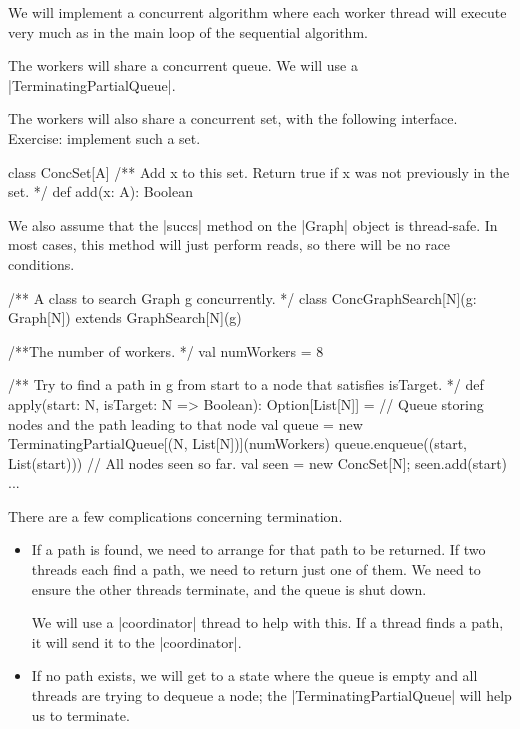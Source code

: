 
\begin{slide}

We will implement a concurrent algorithm where each worker thread will execute
very much as in the main loop of the sequential algorithm.

The workers will share a concurrent queue.  We will use a
|TerminatingPartialQueue|. 

The workers will also share a concurrent set, with the following interface.
Exercise: implement such a set.
%
\begin{scala}
class ConcSet[A]{
  /** Add x to this set.  Return true if x was not previously in the set. */
  def add(x: A): Boolean
}
\end{scala}

We also assume that the |succs| method on the |Graph| object is thread-safe.
In most cases, this method will just perform reads, so there will be no race
conditions. 
\end{slide}


\begin{slide}

\begin{scala}
/** A class to search Graph g concurrently. */
class ConcGraphSearch[N](g: Graph[N]) extends GraphSearch[N](g){
  /**The number of workers. */
  val numWorkers = 8

  /** Try to find a path in g from start to a node that satisfies isTarget. */
  def apply(start: N, isTarget: N => Boolean): Option[List[N]] = {
    // Queue storing nodes and the path leading to that node
    val queue = new TerminatingPartialQueue[(N, List[N])](numWorkers)
    queue.enqueue((start, List(start)))
    // All nodes seen so far.
    val seen = new ConcSet[N]; seen.add(start)
    ...
  }
}
\end{scala}
\end{slide}


\begin{slide}

There are a few complications concerning termination.
%
\begin{itemize}
\item If a path is found, we need to arrange for that path to be returned.  If
two threads each find a path, we need to return just one of them.  We need to
ensure the other threads terminate, and the queue is shut down.

We will use a |coordinator| thread to help with this.  If a thread finds a
path, it will send it to the |coordinator|.

\item If no path exists, we will get to a state where the queue is empty and
all threads are trying to dequeue a node; the |TerminatingPartialQueue| will
help us to terminate.
\end{itemize}
\end{slide}

